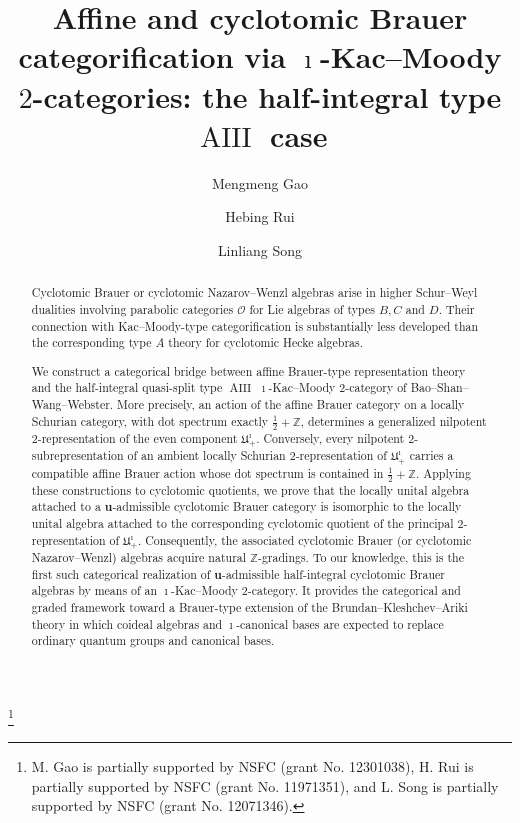 \documentclass[a4,10pt]{amsart}
\numberwithin{equation}{section}
\theoremstyle{definition}
\begin{document}
\setlength{\baselineskip}{14pt}

\title[Affine Brauer categorification]
{Affine and cyclotomic Brauer categorification via $\imath$-Kac--Moody $2$-categories: the half-integral type 
 $\operatorname{AIII}$ case
}

\author{Mengmeng  Gao}
\author{Hebing  Rui}
\author{Linliang Song}
\address{School of Mathematical Sciences, Tongji University, Shanghai, 200092, China.}
\thanks{M. Gao is  partially supported by NSFC (grant No. 12301038), H. Rui is partially supported   by NSFC (grant No.  11971351), and  L. Song is  partially supported   by NSFC (grant No.  12071346). }


\begin{abstract}
 Cyclotomic Brauer or cyclotomic   Nazarov–Wenzl algebras arise in higher Schur–Weyl dualities involving parabolic categories $\mathcal O$ for Lie algebras of types $B,C$ and $D$. 
  Their connection with Kac--Moody-type categorification is substantially less developed than the corresponding type $A$ theory for cyclotomic Hecke algebras.

We construct a categorical bridge between affine Brauer-type representation theory and the half-integral quasi-split type $\operatorname{AIII}$ $\imath$-Kac--Moody $2$-category of Bao–Shan–Wang–Webster. More precisely, an action of the affine Brauer category on a locally Schurian category, with dot spectrum exactly $\frac12+\mathbb Z$, determines a generalized nilpotent 2-representation of the even component $\mathfrak  U^{\imath}_{+}$. Conversely, every nilpotent $2$-subrepresentation of an ambient locally Schurian $2$-representation of $\mathfrak  U^{\imath}_{+}$ carries a compatible affine Brauer action whose dot spectrum is contained in $\frac12+\mathbb Z$. Applying these constructions to cyclotomic quotients, we prove that the locally unital algebra attached to a $\mathbf u$-admissible cyclotomic Brauer category is isomorphic to the locally unital  algebra attached to the corresponding cyclotomic quotient of the principal $2$-representation of $\mathfrak  U^{\imath}_{+}$. Consequently, the associated cyclotomic Brauer (or cyclotomic Nazarov–Wenzl) algebras acquire natural $\mathbb Z$-gradings. To our knowledge, this is the first such categorical realization of 
$\mathbf u$-admissible half-integral cyclotomic Brauer algebras by means of an $\imath$-Kac--Moody $2$-category. It provides the categorical and graded framework toward a Brauer-type extension of the Brundan–Kleshchev–Ariki theory in which coideal algebras and $\imath$-canonical bases are expected to replace  ordinary quantum groups and canonical bases.
\end{abstract}
\end{document}
